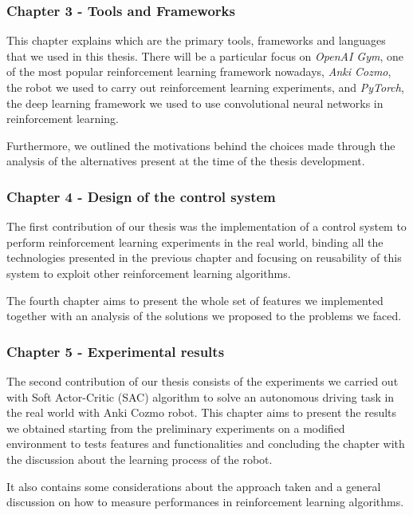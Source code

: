 \subsubsection*{Chapter 3 - Tools and Frameworks} 

This chapter explains which are the primary tools, frameworks and languages that we used in this thesis.
There will be a particular focus on \textit{OpenAI Gym}, one of the most popular reinforcement learning framework nowadays, \textit{Anki Cozmo}, the robot we used to carry out reinforcement learning experiments, and \textit{PyTorch}, the deep learning framework we used to use convolutional neural networks in reinforcement learning.

Furthermore, we outlined the motivations behind the choices made through the analysis of the alternatives present at the time of the thesis development.

\subsubsection*{Chapter 4 - Design of the control system}

The first contribution of our thesis was the implementation of a control system to perform reinforcement learning experiments in the real world, binding all the technologies presented in the previous chapter and focusing on reusability of this system to exploit other reinforcement learning algorithms.

The fourth chapter aims to present the whole set of features we implemented together with an analysis of the solutions we proposed to the problems we faced.

\subsubsection*{Chapter 5 - Experimental results} 

The second contribution of our thesis consists of the experiments we carried out with Soft Actor-Critic (SAC) algorithm to solve an autonomous driving task in the real world with Anki Cozmo robot.
This chapter aims to present the results we obtained starting from the preliminary experiments on a modified environment to tests features and functionalities and concluding the chapter with the discussion about the learning process of the robot.

It also contains some considerations about the approach taken and a general discussion on how to measure performances in reinforcement learning algorithms.

